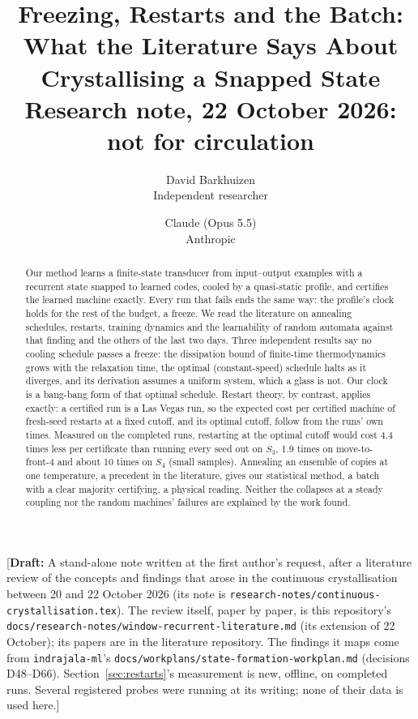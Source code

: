 \documentclass[11pt]{article}
\title{Freezing, Restarts and the Batch:\\What the Literature Says About Crystallising a Snapped State\\[0.5em]
\large Research note, 22 October 2026: not for circulation}
\author{
  David Barkhuizen\\
  Independent researcher
  \and
  Claude (Opus 5.5)\\
  Anthropic
}
\date{}
\newcommand{\draftnote}[1]{\textcolor{red!70!black}{[\textbf{Draft:} #1]}}
\begin{document}
\maketitle

\draftnote{A stand-alone note written at the first author's request, after a literature review of the
concepts and findings that arose in the continuous crystallisation between 20 and 22 October 2026
(its note is \texttt{research-notes/continuous-crystallisation.tex}). The review itself, paper by paper, is this repository's
\texttt{docs/\allowbreak research-notes/\allowbreak window-recurrent-\allowbreak literature.md} (its extension of 22 October); its papers are in the
literature repository. The findings it maps come from \texttt{indrajala-ml}'s \texttt{docs/\allowbreak workplans/\allowbreak state-formation-\allowbreak workplan.md}
(decisions D48--D66). Section~\ref{sec:restarts}'s measurement is new, offline, on completed runs.
Several registered probes were running at its writing; none of their data is used here.}

\begin{abstract}
Our method learns a finite-state transducer from input--output examples with a recurrent state
snapped to learned codes, cooled by a quasi-static profile, and certifies the learned machine
exactly. Every run that fails ends the same way: the profile's clock holds for the rest of the
budget, a freeze. We read the literature on annealing schedules, restarts, training dynamics and the
learnability of random automata against that finding and the others of the last two days. Three
independent results say no cooling schedule passes a freeze: the dissipation bound of finite-time
thermodynamics grows with the relaxation time, the optimal (constant-speed) schedule halts as it
diverges, and its derivation assumes a uniform system, which a glass is not. Our clock is a
bang-bang form of that optimal schedule. Restart theory, by contrast, applies exactly: a certified
run is a Las Vegas run, so the expected cost per certified machine of fresh-seed restarts at a fixed
cutoff, and its optimal cutoff, follow from the runs' own times. Measured on the completed runs,
restarting at the optimal cutoff would cost 4.4 times less per certificate than running every seed out
on $S_3$, 1.9 times on move-to-front-4 and about 10 times on $S_4$ (small samples). Annealing an
ensemble of copies at one temperature, a precedent in the literature, gives our statistical method,
a batch with a clear majority certifying, a physical reading. Neither the collapses at a steady
coupling nor the random machines' failures are explained by the work found.
\end{abstract}
\end{document}
